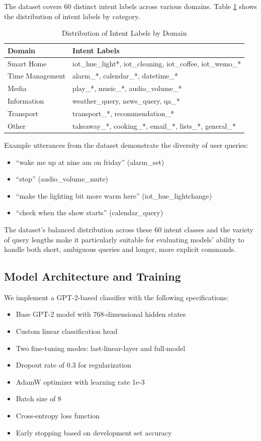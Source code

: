\documentclass{article}
\begin{document}
The dataset covers 60 distinct intent labels across various domains. Table \ref{tab:intent_labels} shows the distribution of intent labels by category.

\begin{table}[h]
\centering
\begin{tabular}{ll}
\toprule
\textbf{Domain} & \textbf{Intent Labels} \\
\midrule
Smart Home & iot\_hue\_light*, iot\_cleaning, iot\_coffee, iot\_wemo\_* \\
\midrule
Time Management & alarm\_*, calendar\_*, datetime\_* \\
\midrule
Media & play\_*, music\_*, audio\_volume\_* \\
\midrule
Information & weather\_query, news\_query, qa\_* \\
\midrule
Transport & transport\_*, recommendation\_* \\
\midrule
Other & takeaway\_*, cooking\_*, email\_*, lists\_*, general\_* \\
\bottomrule
\end{tabular}
\caption{Distribution of Intent Labels by Domain}
\label{tab:intent_labels}
\end{table}

Example utterances from the dataset demonstrate the diversity of user queries:
\begin{itemize}
    \item ``wake me up at nine am on friday'' (alarm\_set)
    \item ``stop'' (audio\_volume\_mute)
    \item ``make the lighting bit more warm here'' (iot\_hue\_lightchange)
    \item ``check when the show starts'' (calendar\_query)
\end{itemize}

The dataset's balanced distribution across these 60 intent classes and the variety of query lengths make it particularly suitable for evaluating models' ability to handle both short, ambiguous queries and longer, more explicit commands.

\subsection{Model Architecture and Training}
We implement a GPT-2-based classifier with the following specifications:
\begin{itemize}
    \item Base GPT-2 model with 768-dimensional hidden states
    \item Custom linear classification head
    \item Two fine-tuning modes: last-linear-layer and full-model
    \item Dropout rate of 0.3 for regularization
    \item AdamW optimizer with learning rate 1e-3
    \item Batch size of 8
    \item Cross-entropy loss function
    \item Early stopping based on development set accuracy
\end{itemize}
\end{document}

